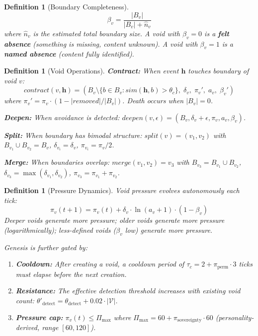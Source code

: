 \documentclass[11pt]{article}
\newtheorem{definition}[theorem]{Definition}
\begin{document}
\begin{definition}[Boundary Completeness]
\label{def:beta}
\begin{equation}
\beta_v = \frac{|B_v|}{|B_v| + \hat{n}_v}
\end{equation}
where $\hat{n}_v$ is the estimated total boundary size. A void with $\beta_v = 0$ is a \textbf{felt absence} (something is missing, content unknown). A void with $\beta_v = 1$ is a \textbf{named absence} (content fully identified).
\end{definition}

\begin{definition}[Void Operations]
\label{def:void-ops}
\textbf{Contract:} When event $\mathbf{h}$ touches boundary of void $v$:
\begin{equation}
contract(v, \mathbf{h}) = (B_v \setminus \{b \in B_v : sim(\mathbf{h}, b) > \theta_c\},\; \delta_v,\; \pi_v',\; a_v,\; \beta_v')
\end{equation}
where $\pi_v' = \pi_v \cdot (1 - |removed|/|B_v|)$. Death occurs when $|B_v| = 0$.

\textbf{Deepen:} When avoidance is detected: $deepen(v, \epsilon) = (B_v, \delta_v + \epsilon, \pi_v, a_v, \beta_v)$.

\textbf{Split:} When boundary has bimodal structure: $split(v) = (v_1, v_2)$ with $B_{v_1} \cup B_{v_2} = B_v$, $\delta_{v_i} = \delta_v$, $\pi_{v_i} = \pi_v/2$.

\textbf{Merge:} When boundaries overlap: $merge(v_1, v_2) = v_3$ with $B_{v_3} = B_{v_1} \cup B_{v_2}$, $\delta_{v_3} = \max(\delta_{v_1}, \delta_{v_2})$, $\pi_{v_3} = \pi_{v_1} + \pi_{v_2}$.
\end{definition}

\begin{definition}[Pressure Dynamics]
\label{def:pressure}
Void pressure evolves autonomously each tick:
\begin{equation}
\pi_v(t+1) = \pi_v(t) + \delta_v \cdot \ln(a_v + 1) \cdot (1 - \beta_v)
\label{eq:pressure}
\end{equation}
Deeper voids generate more pressure; older voids generate more pressure (logarithmically); less-defined voids ($\beta_v$ low) generate more pressure.

Genesis is further gated by:
\begin{enumerate}
\item \textbf{Cooldown:} After creating a void, a cooldown period of $\tau_c = 2 + \pi_{\text{perm}} \cdot 3$ ticks must elapse before the next creation.
\item \textbf{Resistance:} The effective detection threshold increases with existing void count: $\theta'_{\text{detect}} = \theta_{\text{detect}} + 0.02 \cdot |\mathcal{V}|$.
\item \textbf{Pressure cap:} $\pi_v(t) \leq \Pi_{\max}$ where $\Pi_{\max} = 60 + \pi_{\text{sovereignty}} \cdot 60$ (personality-derived, range $[60, 120]$).
\end{enumerate}
\end{definition}
\end{document}
